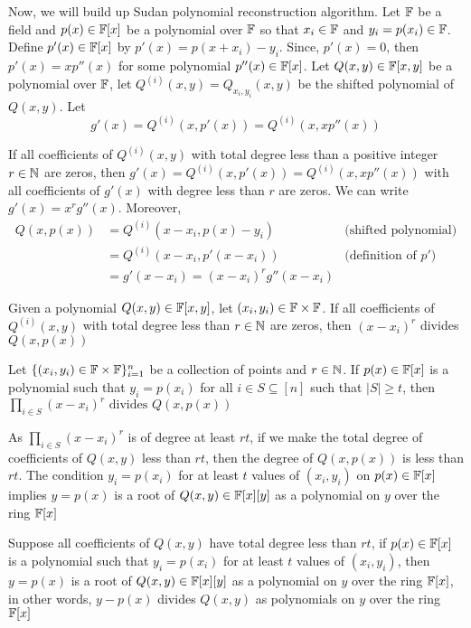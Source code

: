 \documentclass{article}
\begin{document}
Now, we will build up Sudan polynomial reconstruction algorithm. Let $\mathbb{F}$ be a field and $p(x) \in \mathbb{F}[x]$ be a polynomial over $\mathbb{F}$ so that $x_i \in \mathbb{F}$ and $y_i = p(x_i) \in \mathbb{F}$. Define $p'(x) \in \mathbb{F}[x]$ by $
    p'(x) = p(x + x_i) - y_i
$. Since, $p'(x) = 0$, then $p'(x) = x p''(x)$ for some polynomial $p''(x) \in \mathbb{F}[x]$. Let $Q(x, y) \in \mathbb{F}[x, y]$ be a polynomial over $\mathbb{F}$, let $Q^{(i)}(x, y) = Q_{x_i, y_i}(x, y)$ be the shifted polynomial of $Q(x, y)$. Let
$$
    g'(x) = Q^{(i)}(x, p'(x)) = Q^{(i)}(x, x p''(x))
$$

If all coefficients of $Q^{(i)}(x, y)$ with total degree less than a positive integer $r \in \mathbb{N}$ are zeros, then $g'(x) = Q^{(i)}(x, p'(x)) = Q^{(i)}(x, x p''(x))$ with all coefficients of $g'(x)$ with degree less than $r$ are zeros. We can write $g'(x) = x^r g''(x)$. Moreover, 
\begin{align*}
    Q(x, p(x))
    &= Q^{(i)}(x - x_i, p(x) - y_i) &\text{(shifted polynomial)} \\
    &= Q^{(i)}(x - x_i, p'(x - x_i)) &\text{(definition of $p'$)} \\
    &= g'(x - x_i) = (x - x_i)^r g''(x - x_i)
\end{align*}

\begin{assumption}
    \label{assumption_divide_r}
    Given a polynomial $Q(x, y) \in \mathbb{F}[x, y]$, let $(x_i, y_i) \in \mathbb{F} \times \mathbb{F}$. If all coefficients of $Q^{(i)}(x, y)$ with total degree less than $r \in \mathbb{N}$ are zeros, then $(x - x_i)^r$ divides $Q(x, p(x))$
\end{assumption}

Let $\{(x_i, y_i) \in \mathbb{F} \times \mathbb{F}\}_{i=1}^n$ be a collection of points and $r \in \mathbb{N}$. If $p(x) \in \mathbb{F}[x]$ is a polynomial such that $y_i = p(x_i)$ for all $i \in S \subseteq [n]$ such that $|S| \geq t$, then $
    \prod_{i \in S} (x - x_i)^r \text{ divides } Q(x, p(x))
$

As $\prod_{i \in S} (x - x_i)^r$ is of degree at least $rt$, if we make the total degree of coefficients of $Q(x, y)$ less than $rt$, then the degree of $Q(x, p(x))$ is less than $rt$. The condition $y_i = p(x_i)$ for at least $t$ values of $(x_i, y_i)$ on $p(x) \in \mathbb{F}[x]$ implies $y = p(x)$ is a root of $Q(x, y) \in \mathbb{F}[x][y]$ as a polynomial on $y$ over the ring $\mathbb{F}[x]$

\begin{assumption}
    \label{assumption_divide_rt}
    Suppose all coefficients of $Q(x, y)$ have total degree less than $rt$, if $p(x) \in \mathbb{F}[x]$ is a polynomial such that $y_i = p(x_i)$ for at least $t$ values of $(x_i, y_i)$, then $y = p(x)$ is a root of $Q(x, y) \in \mathbb{F}[x][y]$ as a polynomial on $y$ over the ring $\mathbb{F}[x]$, in other words, $y - p(x)$ divides $Q(x, y)$ as polynomials on $y$ over the ring $\mathbb{F}[x]$
\end{assumption}
\end{document}
